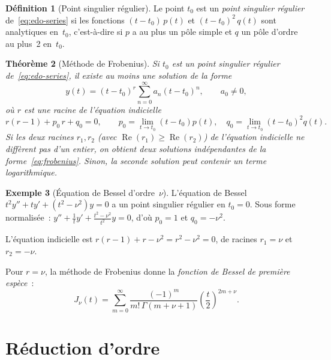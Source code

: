 \documentclass[12pt,a4paper,openany]{book}
\theoremstyle{definition}
\newtheorem{definition}{Définition}[chapter]
\newtheorem{exemple}[definition]{Exemple}
\theoremstyle{plain}
\newtheorem{theoreme}[definition]{Théorème}
\theoremstyle{remark}
\begin{document}
\begin{definition}[Point singulier régulier]\label{def:point-sing-reg}
  Le point $t_0$ est un \emph{point singulier régulier}
  de~\eqref{eq:edo-series} si les fonctions $(t-t_0)\,p(t)$ et
  $(t-t_0)^2\,q(t)$ sont analytiques en~$t_0$, c'est-à-dire si $p$ a
  au plus un pôle simple et $q$ un pôle d'ordre au plus~2 en~$t_0$.
\end{definition}

\begin{theoreme}[Méthode de Frobenius]\label{thm:frobenius}
  Si $t_0$ est un point singulier régulier de~\eqref{eq:edo-series},
  il existe au moins une solution de la forme
  \begin{equation}\label{eq:frobenius}
    y(t) = (t-t_0)^r \sum_{n=0}^{\infty} a_n (t-t_0)^n, \qquad a_0 \neq 0,
  \end{equation}
  où $r$ est une racine de l'\emph{équation indicielle}
  \[
    r(r-1) + p_0\,r + q_0 = 0, \qquad
    p_0 = \lim_{t\to t_0}(t-t_0)p(t), \quad
    q_0 = \lim_{t\to t_0}(t-t_0)^2 q(t).
  \]
  Si les deux racines $r_1, r_2$ (avec $\operatorname{Re}(r_1) \geq
  \operatorname{Re}(r_2)$) de l'équation indicielle ne diffèrent pas
  d'un entier, on obtient deux solutions indépendantes de la
  forme~\eqref{eq:frobenius}. Sinon, la seconde solution peut contenir
  un terme logarithmique.
\end{theoreme}

\begin{exemple}[Équation de Bessel d'ordre~$\nu$]\label{ex:bessel}
  L'équation de Bessel $t^2 y'' + ty' + (t^2 - \nu^2)y = 0$ a un
  point singulier régulier en $t_0 = 0$. Sous forme normalisée~:
  $y'' + \frac{1}{t}y' + \frac{t^2 - \nu^2}{t^2}y = 0$, d'où
  $p_0 = 1$ et $q_0 = -\nu^2$.

  L'équation indicielle est $r(r-1) + r - \nu^2 = r^2 - \nu^2 = 0$,
  de racines $r_1 = \nu$ et $r_2 = -\nu$.

  Pour $r = \nu$, la méthode de Frobenius donne la \emph{fonction de
  Bessel de première espèce}~:
  \[
    J_\nu(t) = \sum_{m=0}^{\infty}
      \frac{(-1)^m}{m!\,\Gamma(m+\nu+1)}
      \left(\frac{t}{2}\right)^{2m+\nu}.
  \]
\end{exemple}

\section{Réduction d'ordre}\label{sec:reduction-ordre}
\end{document}
